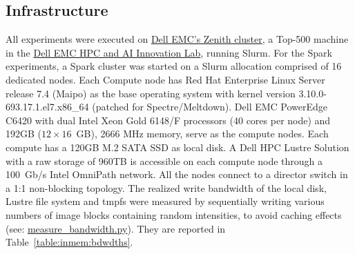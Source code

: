 




\subsection{Infrastructure} %

 All experiments were executed on
 \href{https://www.dellemc.com/resources/en-us/asset/sales-documents/products/storage/h16221-hpc-lab-brochure.pdf}{Dell
 EMC's Zenith cluster}, a Top-500 machine in the
 \href{https://www.dellemc.com/en-us/solutions/high-performance-computing/HPC-AI-Innovation-Lab.htm}{Dell
 EMC HPC and AI Innovation Lab}, running Slurm. For the Spark experiments, a
 Spark cluster was started on a Slurm allocation comprised of 16 dedicated
 nodes. Each Compute node has Red Hat Enterprise Linux Server release 7.4
 (Maipo) as the base operating system with kernel version
 3.10.0-693.17.1.el7.x86\_64 (patched for Spectre/Meltdown). Dell EMC PowerEdge
 C6420 with dual Intel Xeon Gold 6148/F processors (40 cores per node) and 192GB
 ($12\times16$~GB), 2666 MHz memory, serve as the compute nodes. Each compute
 has a 120GB M.2 SATA SSD as local disk. A Dell HPC Lustre Solution with a raw
 storage of 960TB is accessible on each compute node through a 100~Gb/s Intel
 OmniPath network. All the nodes connect to a director switch in a 1:1
 non-blocking topology. The realized write bandwidth of the local disk, Lustre
 file system and tmpfs were measured by sequentially writing various numbers of
 image blocks containing random intensities, to avoid caching effects (see:
 \href{https://github.com/big-data-lab-team/paper-in-mem-locality/blob/master/benchmark_scripts/measure_bandwidth.py}{measure\_bandwidth.py}).
 They are reported in Table~\ref{table:inmem:bdwdths}.

